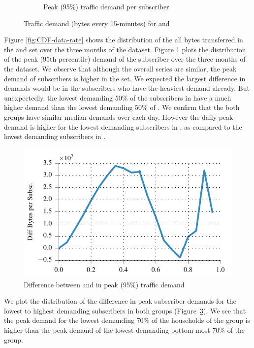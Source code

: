 \begin{figure}[t]
\begin{minipage}{1\linewidth}
\begin{subfigure}[b]{1\linewidth}
               \caption{Peak (95\%) traffic demand per subscriber\label{fig:CDF-data-rate-perc95}}
\end{subfigure}
%
\end{minipage}
\caption{Traffic demand (bytes every 15-minutes) for \control{} and \treatment{}\label{fig:traffic-demand-cdf}}
\end{figure}

Figure \ref{fig:CDF-data-rate} shows the distribution of the
all bytes transferred in the \treatment{} and \control{} set
over the three months of the dataset. Figure \ref{fig:CDF-data-rate-perc95}
plots the distribution of the peak (95th percentile) demand of the
subscriber over the three months of the dataset. We observe that
although the overall series are similar, the peak demand of subscribers
is higher in the \treatment{} set. We expected the largest difference
in demands would be in the subscribers who have the heaviest demand already.
But unexpectedly, the lowest demanding 50\% of the subscribers in
\treatment{} have a much higher demand than the lowest demanding 50\% of \control{}.
We confirm that the both groups have similar median demands over each day. However
the daily peak demand is higher for the lowest demanding subscribers in
 \treatment{}, as compared to the lowest demanding subscribers in \control{}.

\begin{figure}[t]
\centering
\includegraphics[width=\linewidth]{figures/diff_perc95_bytes_subsc-overall.pdf}
               \caption{Difference between \treatment{} and \control{}
               in peak (95\%) traffic demand\label{fig:diff-perc95}}
\end{figure}

We plot the distribution of the difference in peak subscriber demands for
the lowest to highest demanding subscribers in both groups (Figure~\ref{fig:diff-perc95}).
We see that the peak demand for the lowest demanding 70\% of the households of
the \treatment{} group is higher than the peak demand of the lowest demanding bottom-most
70\% of the \control{} group.

